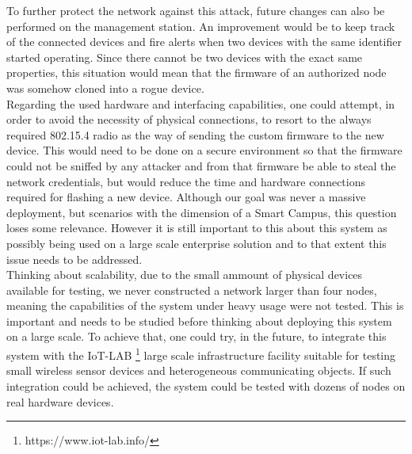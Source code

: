 To further protect the network against this attack, future changes can also be performed on the management station. An improvement would be to keep track of the connected devices and fire alerts when two devices with the same identifier started operating. Since there cannot be two devices with the exact same properties, this situation would mean that the firmware of an authorized node was somehow cloned into a rogue device.
\\
Regarding the used hardware and interfacing capabilities, one could attempt, in order to avoid the necessity of physical connections, to resort to the always required 802.15.4 radio as the way of sending the custom firmware to the new device. This would need to be done on a secure environment so that the firmware could not be sniffed by any attacker and from that firmware be able to steal the network credentials, but would reduce the time and hardware connections required for flashing a new device. Although our goal was never a massive deployment, but scenarios with the dimension of a Smart Campus, this question loses some relevance. However it is still important to this about this system as possibly being used on a large scale enterprise solution and to that extent this issue needs to be addressed.\\
Thinking about scalability, due to the small ammount of physical devices available for testing, we never constructed a network larger than four nodes, meaning the capabilities of the system under heavy usage were not tested. This is important and needs to be studied before thinking about deploying this system on a large scale. To achieve that, one could try, in the future, to integrate this system with the IoT-LAB \footnote{https://www.iot-lab.info/} large scale infrastructure facility suitable for testing small wireless sensor devices and heterogeneous communicating objects. If such integration could be achieved, the system could be tested with dozens of nodes on real hardware devices.\\


